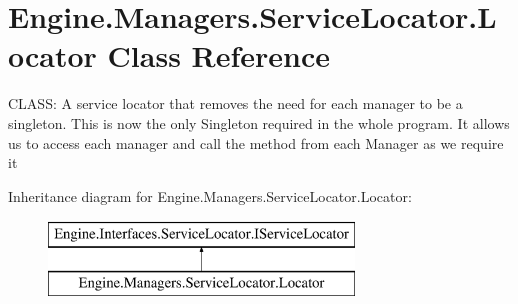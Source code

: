 \hypertarget{a00542}{}\section{Engine.\+Managers.\+Service\+Locator.\+Locator Class Reference}
\label{a00542}


C\+L\+A\+SS\+: A service locator that removes the need for each manager to be a singleton. This is now the only Singleton required in the whole program. It allows us to access each manager and call the method from each Manager as we require it  


Inheritance diagram for Engine.\+Managers.\+Service\+Locator.\+Locator\+:\begin{figure}[H]
\begin{center}
\leavevmode
\includegraphics[height=2.000000cm]{d0/ddb/a00542}
\end{center}
\end{figure}
